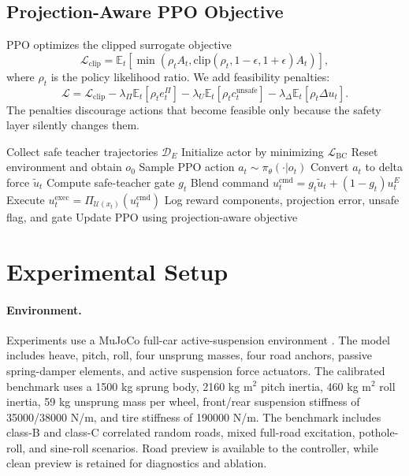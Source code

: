 \documentclass[letterpaper,twocolumn]{article}
\begin{document}
\subsection{Projection-Aware PPO Objective}

PPO optimizes the clipped surrogate objective
\begin{equation}
    \mathcal{L}_{\mathrm{clip}}
    =
    \mathbb{E}_t
    \left[
    \min(\rho_t A_t,\mathrm{clip}(\rho_t,1-\epsilon,1+\epsilon)A_t)
    \right],
\end{equation}
where $\rho_t$ is the policy likelihood ratio.
We add feasibility penalties:
\begin{equation}
    \mathcal{L}
    =
    \mathcal{L}_{\mathrm{clip}}
    -
    \lambda_\Pi \mathbb{E}_t[\rho_t e^\Pi_t]
    -
    \lambda_U \mathbb{E}_t[\rho_t c^{\mathrm{unsafe}}_t]
    -
    \lambda_\Delta \mathbb{E}_t[\rho_t \Delta u_t].
\end{equation}
The penalties discourage actions that become feasible only because the safety layer silently changes them.

\begin{algorithm}[t]
\caption{STG-PPO Online Adaptation}
\label{alg:stgppo}
\begin{algorithmic}[1]
\STATE Collect safe teacher trajectories $\mathcal{D}_E$
\STATE Initialize actor by minimizing $\mathcal{L}_{\mathrm{BC}}$
    \STATE Reset environment and obtain $o_0$
        \STATE Sample PPO action $a_t \sim \pi_\theta(\cdot|o_t)$
        \STATE Convert $a_t$ to delta force $\tilde{u}_t$
        \STATE Compute safe-teacher gate $g_t$
        \STATE Blend command $u^{\mathrm{cmd}}_t=g_t\tilde{u}_t+(1-g_t)u^E_t$
        \STATE Execute $u^{\mathrm{exec}}_t=\Pi_{\mathcal{U}(x_t)}(u^{\mathrm{cmd}}_t)$
        \STATE Log reward components, projection error, unsafe flag, and gate
    \ENDFOR
    \STATE Update PPO using projection-aware objective
\ENDFOR
\end{algorithmic}
\end{algorithm}

\section{Experimental Setup}

\paragraph{Environment.}
Experiments use a MuJoCo full-car active-suspension environment \citep{todorov2012mujoco}.
The model includes heave, pitch, roll, four unsprung masses, four road anchors, passive spring-damper elements, and active suspension force actuators.
The calibrated benchmark uses a 1500 kg sprung body, 2160 kg m$^2$ pitch inertia, 460 kg m$^2$ roll inertia, 59 kg unsprung mass per wheel, front/rear suspension stiffness of 35000/38000 N/m, and tire stiffness of 190000 N/m.
The benchmark includes class-B and class-C correlated random roads, mixed full-road excitation, pothole-roll, and sine-roll scenarios.
Road preview is available to the controller, while clean preview is retained for diagnostics and ablation.
\end{document}
